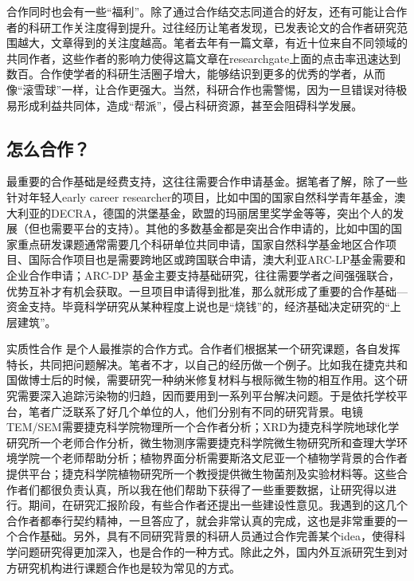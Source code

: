 \documentclass[
]{book}
\begin{document}
合作同时也会有一些``福利''。除了通过合作结交志同道合的好友，还有可能让合作者的科研工作关注度得到提升。过往经历让笔者发现，已发表论文的合作者研究范围越大，文章得到的关注度越高。笔者去年有一篇文章，有近十位来自不同领域的共同作者，这些作者的影响力使得这篇文章在researchgate上面的点击率迅速达到数百。合作使学者的科研生活圈子增大，能够结识到更多的优秀的学者，从而像``滚雪球''一样，让合作更强大。当然，科研合作也需警惕，因为一旦错误对待极易形成利益共同体，造成``帮派''，侵占科研资源，甚至会阻碍科学发展。

\hypertarget{ux600eux4e48ux5408ux4f5c}{%
\subsection{怎么合作？}\label{ux600eux4e48ux5408ux4f5c}}

最重要的合作基础是经费支持，这往往需要合作申请基金。据笔者了解，除了一些针对年轻人early career researcher的项目，比如中国的国家自然科学青年基金，澳大利亚的DECRA，德国的洪堡基金，欧盟的玛丽居里奖学金等等，突出个人的发展（但也需要平台的支持）。其他的多数基金都是突出合作申请的，比如中国的国家重点研发课题通常需要几个科研单位共同申请，国家自然科学基金地区合作项目、国际合作项目也是需要跨地区或跨国联合申请，澳大利亚ARC-LP基金需要和企业合作申请；ARC-DP 基金主要支持基础研究，往往需要学者之间强强联合，优势互补才有机会获取。一旦项目申请得到批准，那么就形成了重要的合作基础---资金支持。毕竟科学研究从某种程度上说也是``烧钱''的，经济基础决定研究的``上层建筑''。

实质性合作 是个人最推崇的合作方式。合作者们根据某一个研究课题，各自发挥特长，共同把问题解决。笔者不才，以自己的经历做一个例子。比如我在捷克共和国做博士后的时候，需要研究一种纳米修复材料与根际微生物的相互作用。这个研究需要深入追踪污染物的归趋，因而要用到一系列平台解决问题。于是依托学校平台，笔者广泛联系了好几个单位的人，他们分别有不同的研究背景。电镜TEM/SEM需要捷克科学院物理所一个合作者分析；XRD为捷克科学院地球化学研究所一个老师合作分析，微生物测序需要捷克科学院微生物研究所和查理大学环境学院一个老师帮助分析；植物界面分析需要斯洛文尼亚一个植物学背景的合作者提供平台；捷克科学院植物研究所一个教授提供微生物菌剂及实验材料等。这些合作者们都很负责认真，所以我在他们帮助下获得了一些重要数据，让研究得以进行。期间，在研究汇报阶段，有些合作者还提出一些建设性意见。我遇到的这几个合作者都奉行契约精神，一旦答应了，就会非常认真的完成，这也是非常重要的一个合作基础。另外，具有不同研究背景的科研人员通过合作完善某个idea，使得科学问题研究得更加深入，也是合作的一种方式。除此之外，国内外互派研究生到对方研究机构进行课题合作也是较为常见的方式。
\end{document}
